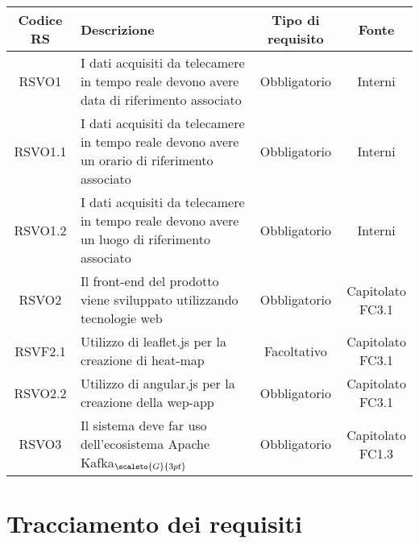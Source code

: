 {\begin{center}
	\renewcommand{\arraystretch}{1.4}
	\begin{tabularx}{\textwidth}{ |c|X|c|c| }
		\hline
		\rowcolor{Melon}
		\textbf{Codice RS} & \textbf{Descrizione} & \textbf{Tipo di requisito} & \textbf{Fonte} \\
			\hline
		RSVO1  & I dati acquisiti da telecamere in tempo reale devono avere data di riferimento associato  &Obbligatorio & Interni \\
		\hline
		RSVO1.1  & I dati acquisiti da telecamere in tempo reale devono avere un orario di riferimento associato &Obbligatorio & Interni \\
		\hline
		RSVO1.2  & I dati acquisiti da telecamere in tempo reale devono avere un luogo di riferimento associato &Obbligatorio  & Interni \\
		\hline
		RSVO2  & Il front-end del prodotto viene sviluppato utilizzando tecnologie web &Obbligatorio  & \shortstack{Capitolato\\FC3.1} \\
		\hline
		RSVF2.1  & Utilizzo di leaflet.js per la creazione di heat-map & Facoltativo & \shortstack{Capitolato\\FC3.1} \\
	\hline
		RSVO2.2  & Utilizzo di angular.js per la creazione della wep-app  & Obbligatorio  & \shortstack{Capitolato\\FC3.1} \\
\hline
RSVO3  & Il sistema deve far uso dell'ecosistema Apache Kafka$_{\scaleto{G}{3pt}}$ & Obbligatorio  & \makecell[tcX]{Capitolato\\FC1.3} \\
\hline
	\end{tabularx}
\end{center}

\section{Tracciamento dei requisiti}

}
